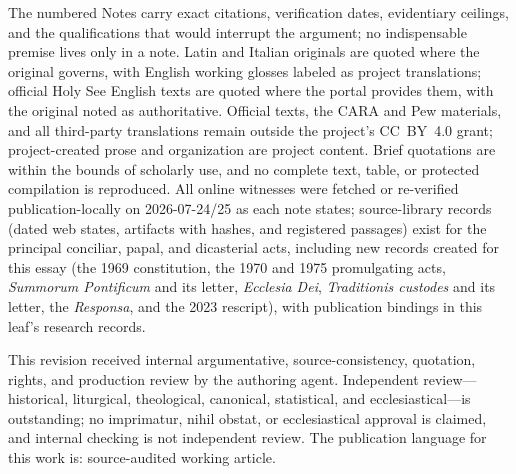 The numbered Notes carry exact citations, verification dates, evidentiary ceilings, and the qualifications that would interrupt the argument; no indispensable premise lives only in a note. Latin and Italian originals are quoted where the original governs, with English working glosses labeled as project translations; official Holy See English texts are quoted where the portal provides them, with the original noted as authoritative. Official texts, the CARA and Pew materials, and all third-party translations remain outside the project's CC~BY~4.0 grant; project-created prose and organization are project content. Brief quotations are within the bounds of scholarly use, and no complete text, table, or protected compilation is reproduced. All online witnesses were fetched or re-verified publication-locally on 2026-07-24/25 as each note states; source-library records (dated web states, artifacts with hashes, and registered passages) exist for the principal conciliar, papal, and dicasterial acts, including new records created for this essay (the 1969 constitution, the 1970 and 1975 promulgating acts, \emph{Summorum Pontificum} and its letter, \emph{Ecclesia Dei}, \emph{Traditionis custodes} and its letter, the \emph{Responsa}, and the 2023 rescript), with publication bindings in this leaf's research records.

This revision received internal argumentative, source-consistency, quotation, rights, and production review by the authoring agent. Independent review---historical, liturgical, theological, canonical, statistical, and ecclesiastical---is outstanding; no imprimatur, nihil obstat, or ecclesiastical approval is claimed, and internal checking is not independent review. The publication language for this work is: source-audited working article.
